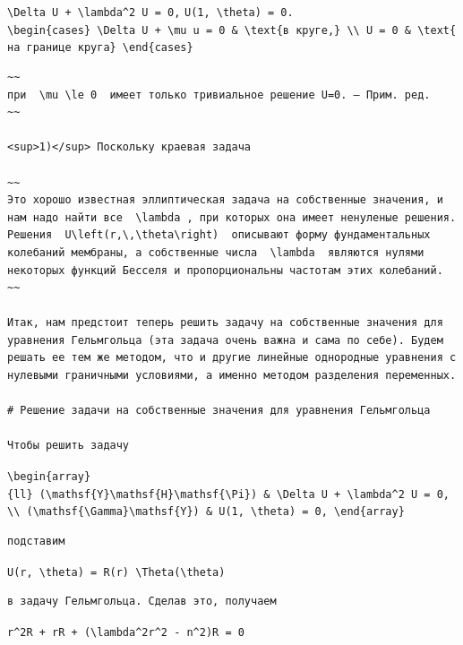 \documentclass[
  ukrainian,
]{article}
\begin{document}
\texttt{\textbackslash{}Delta\ U\ +\ \textbackslash{}lambda\^{}2\ U\ =\ 0,}
\texttt{U(1,\ \textbackslash{}theta)\ =\ 0.}
\texttt{\textbackslash{}begin\{cases\}\ \textbackslash{}Delta\ U\ +\ \textbackslash{}mu\ u\ =\ 0\ \&\ \textbackslash{}text\{в\ круге,\}\ \textbackslash{}\textbackslash{}\ U\ =\ 0\ \&\ \textbackslash{}text\{на\ границе\ круга\}\ \textbackslash{}end\{cases\}}

\begin{verbatim}
~~
при  \mu \le 0  имеет только тривиальное решение U=0. — Прим. ред.
~~

<sup>1)</sup> Поскольку краевая задача

~~
Это хорошо известная эллиптическая задача на собственные значения, и нам надо найти все  \lambda , при которых она имеет ненуленые решения. Решения  U\left(r,\,\theta\right)  описывают форму фундаментальных колебаний мембраны, а собственные числа  \lambda  являются нулями некоторых функций Бесселя и пропорциональны частотам этих колебаний.
~~

Итак, нам предстоит теперь решить задачу на собственные значения для уравнения Гельмгольца (эта задача очень важна и сама по себе). Будем решать ее тем же методом, что и другие линейные однородные уравнения с нулевыми граничными условиями, а именно методом разделения переменных.

# Решение задачи на собственные значения для уравнения Гельмгольца

Чтобы решить задачу
\end{verbatim}

\texttt{\textbackslash{}begin\{array\}\{ll\}\ (\textbackslash{}mathsf\{Y\}\textbackslash{}mathsf\{H\}\textbackslash{}mathsf\{\textbackslash{}Pi\})\ \&\ \textbackslash{}Delta\ U\ +\ \textbackslash{}lambda\^{}2\ U\ =\ 0,\ \textbackslash{}\textbackslash{}\ (\textbackslash{}mathsf\{\textbackslash{}Gamma\}\textbackslash{}mathsf\{Y\})\ \&\ U(1,\ \textbackslash{}theta)\ =\ 0,\ \textbackslash{}end\{array\}}

\begin{verbatim}
подставим
\end{verbatim}

\texttt{U(r,\ \textbackslash{}theta)\ =\ R(r)\ \textbackslash{}Theta(\textbackslash{}theta)}

\begin{verbatim}
в задачу Гельмгольца. Сделав это, получаем
\end{verbatim}

\texttt{r\^{}2R\textquotesingle{}\textquotesingle{}\ +\ rR\textquotesingle{}\ +\ (\textbackslash{}lambda\^{}2r\^{}2\ -\ n\^{}2)R\ =\ 0}
\end{document}
